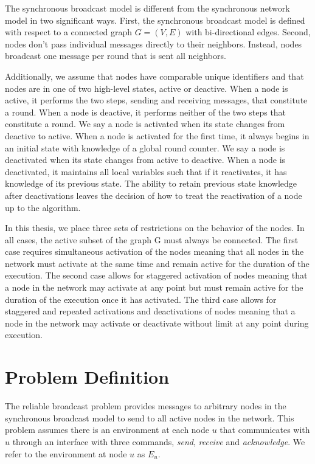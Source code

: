 \documentclass[english]{article}
\begin{document}
The synchronous broadcast model is different from the synchronous network model in two significant ways. First, the synchronous broadcast model is defined with respect to a connected graph $G=(V,E)$ with bi-directional edges. Second, nodes don't pass individual messages directly to their neighbors. Instead, nodes broadcast one message per round that is sent all neighbors. 

Additionally, we assume that nodes have comparable unique identifiers and that nodes are in one of two high-level states, active or deactive. When a node is active, it performs the two steps, sending and receiving messages, that constitute a round. When a node is deactive, it performs neither of the two steps that constitute a round. We say a node is activated when its state changes from deactive to active. When a node is activated for the first time, it always begins in an initial state with knowledge of a global round counter. We say a node is deactivated when its state changes from active to deactive. When a node is deactivated, it maintains all local variables such that if it reactivates, it has knowledge of its previous state. The ability to retain previous state knowledge after deactivations leaves the decision of how to treat the reactivation of a node up to the algorithm.

In this thesis, we place three sets of restrictions on the behavior of the nodes. In all cases, the active subset of the graph G must always be connected. The first case requires simultaneous activation of the nodes meaning that all nodes in the network must activate at the same time and remain active for the duration of the execution. The second case allows for staggered activation of nodes meaning that a node in the network may activate at any point but must remain active for the duration of the execution once it has activated. The third case allows for staggered and repeated activations and deactivations of nodes meaning that a node in the network may activate or deactivate without limit at any point during execution.

\section{Problem Definition}

The reliable broadcast problem provides messages to arbitrary nodes in the synchronous broadcast model to send to all active nodes in the network. This problem assumes there is an environment at each node $u$ that communicates with $u$ through an  interface with three commands, \textit{send}, \textit{receive} and \textit{acknowledge}. We refer to the environment at node $u$ as $E_u$.
\end{document}
